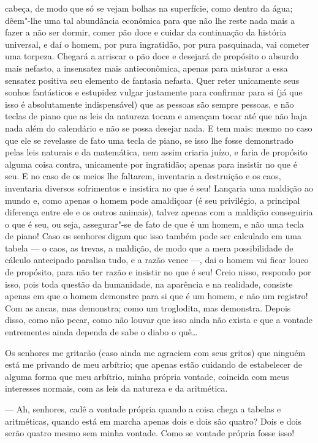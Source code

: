 cabeça, de modo que só se vejam bolhas na superfície, como dentro da
água; dêem"-lhe uma tal abundância econômica para que não lhe reste nada
mais a fazer a não ser dormir, comer pão doce e cuidar da continuação da
história universal, e daí o homem, por pura ingratidão, por pura
pasquinada, vai cometer uma torpeza. Chegará a arriscar o pão doce e
desejará de propósito o absurdo mais nefasto, a insensatez mais
antieconômica, apenas para misturar a essa sensatez positiva seu
elemento de fantasia nefasta. Quer reter unicamente seus sonhos
fantásticos e estupidez vulgar justamente para confirmar para si (já que
isso é absolutamente indispensável) que as pessoas são sempre pessoas, e
não teclas de piano que as leis da natureza tocam e ameaçam tocar até
que não haja nada além do calendário e não se possa desejar nada. E tem
mais: mesmo no caso que ele se revelasse de fato uma tecla de piano, se
isso lhe fosse demonstrado pelas leis naturais e da matemática, nem
assim criaria juízo, e faria de propósito alguma coisa contra,
unicamente por ingratidão; apenas para insistir no que é seu. E no caso
de os meios lhe faltarem, inventaria a destruição e os caos, inventaria
diversos sofrimentos e insistira no que é seu! Lançaria uma maldição ao
mundo e, como apenas o homem pode amaldiçoar (é seu privilégio, a
principal diferença entre ele e os outros animais), talvez apenas com a
maldição conseguiria o que é seu, ou seja, assegurar"-se de fato de que é
um homem, e não uma tecla de piano! Caso os senhores digam que isso
também pode ser calculado em uma tabela --- o caos, as trevas, a
maldição, de modo que a mera possibilidade de cálculo antecipado
paralisa tudo, e a razão vence ---, dai o homem vai ficar louco de
propósito, para não ter razão e insistir no que é seu! Creio nisso,
respondo por isso, pois toda questão da humanidade, na aparência e na
realidade, consiste apenas em que o homem demonstre para si que é um
homem, e não um registro! Com as ancas, mas demonstra; como um
troglodita, mas demonstra. Depois disso, como não pecar, como não louvar
que isso ainda não exista e que a vontade entrementes ainda dependa de
sabe o diabo o quê\ldots{}

Os senhores me gritarão (caso ainda me agraciem com seus gritos) que
ninguém está me privando de meu arbítrio; que apenas estão cuidando de
estabelecer de alguma forma que meu arbítrio, minha própria vontade,
coincida com meus interesses normais, com as leis da natureza e da
aritmética.

--- Ah, senhores, cadê a vontade própria quando a coisa chega a tabelas e
aritméticas, quando está em marcha apenas dois e dois são quatro? Dois e
dois serão quatro mesmo sem minha vontade. Como se vontade própria fosse
isso!

